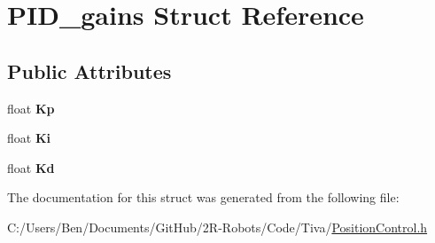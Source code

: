 \hypertarget{struct_p_i_d__gains}{}\section{P\+I\+D\+\_\+gains Struct Reference}
\label{struct_p_i_d__gains}
\subsection*{Public Attributes}
\begin{DoxyCompactItemize}
\item 
\mbox{\label{struct_p_i_d__gains_a90cbc875589c1f344a87450e6075d08b}} 
float {\bfseries Kp}
\item 
\mbox{\label{struct_p_i_d__gains_a4ff56f74a12ab95c99b0a167dc410e14}} 
float {\bfseries Ki}
\item 
\mbox{\label{struct_p_i_d__gains_af9e08a2cf341a54cf815615cdce41c34}} 
float {\bfseries Kd}
\end{DoxyCompactItemize}


The documentation for this struct was generated from the following file\+:\begin{DoxyCompactItemize}
\item 
C\+:/\+Users/\+Ben/\+Documents/\+Git\+Hub/2\+R-\/\+Robots/\+Code/\+Tiva/\mbox{\hyperlink{_position_control_8h}{Position\+Control.\+h}}\end{DoxyCompactItemize}
